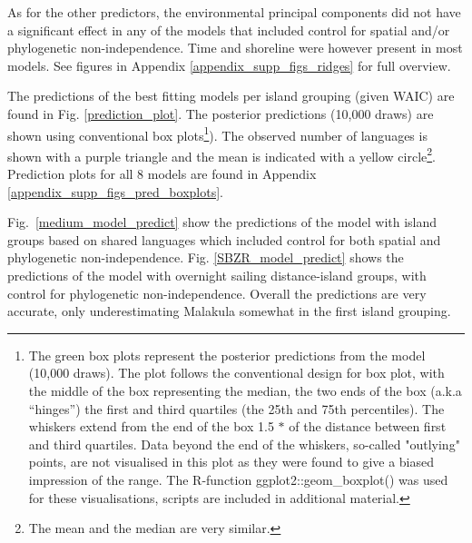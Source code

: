\documentclass[unnumsec,webpdf,modern,medium]{oup-authoring-template}
\begin{document}
As for the other predictors, the environmental principal components did not have a significant effect in any of the models that included control for spatial and/or phylogenetic non-independence. Time and shoreline were however present in most models. See figures in Appendix \ref{appendix_supp_figs_ridges} for full overview.

The predictions of the best fitting models per island grouping (given WAIC) are found in Fig. \ref{prediction_plot}. The posterior predictions (10,000 draws) are shown using conventional box plots\footnote{The green box plots represent the posterior predictions from the model (10,000 draws). The plot follows the conventional design for box plot, with the middle of the box representing the median, the two ends of the box (a.k.a ``hinges'') the first and third quartiles (the 25th and 75th percentiles). The whiskers extend from the end of the box 1.5 $\ast$  of the distance between first and third quartiles. Data beyond the end of the whiskers, so-called "outlying" points, are not visualised in this plot as they were found to give a biased impression of the range. The R-function  ggplot2::geom\_boxplot() was used for these visualisations, scripts are included in additional material.}). The observed number of languages is shown with a purple triangle and the mean is indicated with a yellow circle\footnote{The mean and the median are very similar.}. Prediction plots for all 8 models are found in Appendix \ref{appendix_supp_figs_pred_boxplots}.

Fig.~\ref{medium_model_predict} show the predictions of the model with island groups based on shared languages which included control for both spatial and phylogenetic non-independence. Fig. \ref{SBZR_model_predict} shows the predictions of the model with overnight sailing distance-island groups, with control for phylogenetic non-independence. Overall the predictions are very accurate, only underestimating Malakula somewhat in the first island grouping.

\end{document}
